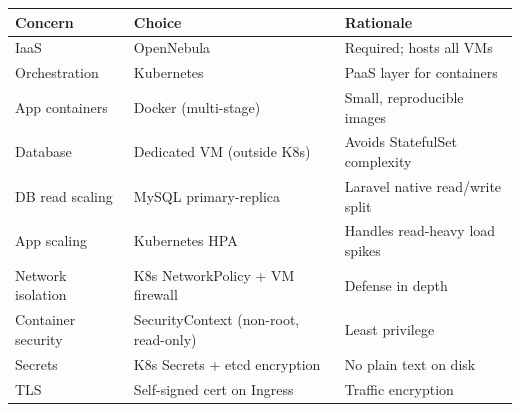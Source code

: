 \documentclass[12pt,a4paper]{article}
\begin{document}
\begin{center}
\begin{tabular}{lll}
\toprule
\textbf{Concern} & \textbf{Choice} & \textbf{Rationale} \\
\midrule
IaaS & OpenNebula & Required; hosts all VMs \\
Orchestration & Kubernetes & PaaS layer for containers \\
App containers & Docker (multi-stage) & Small, reproducible images \\
Database & Dedicated VM (outside K8s) & Avoids StatefulSet complexity \\
DB read scaling & MySQL primary-replica & Laravel native read/write split \\
App scaling & Kubernetes HPA & Handles read-heavy load spikes \\
Network isolation & K8s NetworkPolicy + VM firewall & Defense in depth \\
Container security & SecurityContext (non-root, read-only) & Least privilege \\
Secrets & K8s Secrets + etcd encryption & No plain text on disk \\
TLS & Self-signed cert on Ingress & Traffic encryption \\
\bottomrule
\end{tabular}
\end{center}
\end{document}
